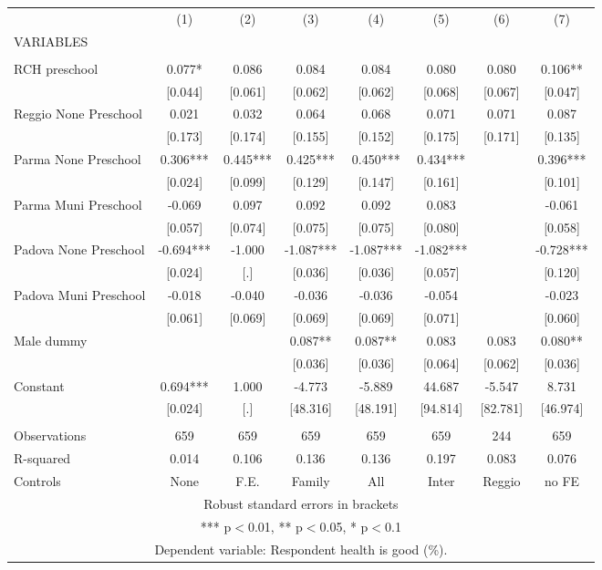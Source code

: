 \begin{tabular}{lccccccc} \hline
 & (1) & (2) & (3) & (4) & (5) & (6) & (7) \\
VARIABLES &  &  &  &  &  &  &  \\ \hline
 &  &  &  &  &  &  &  \\
RCH preschool & 0.077* & 0.086 & 0.084 & 0.084 & 0.080 & 0.080 & 0.106** \\
 & [0.044] & [0.061] & [0.062] & [0.062] & [0.068] & [0.067] & [0.047] \\
Reggio None Preschool & 0.021 & 0.032 & 0.064 & 0.068 & 0.071 & 0.071 & 0.087 \\
 & [0.173] & [0.174] & [0.155] & [0.152] & [0.175] & [0.171] & [0.135] \\
Parma None Preschool & 0.306*** & 0.445*** & 0.425*** & 0.450*** & 0.434*** &  & 0.396*** \\
 & [0.024] & [0.099] & [0.129] & [0.147] & [0.161] &  & [0.101] \\
Parma Muni Preschool & -0.069 & 0.097 & 0.092 & 0.092 & 0.083 &  & -0.061 \\
 & [0.057] & [0.074] & [0.075] & [0.075] & [0.080] &  & [0.058] \\
Padova None Preschool & -0.694*** & -1.000 & -1.087*** & -1.087*** & -1.082*** &  & -0.728*** \\
 & [0.024] & [.] & [0.036] & [0.036] & [0.057] &  & [0.120] \\
Padova Muni Preschool & -0.018 & -0.040 & -0.036 & -0.036 & -0.054 &  & -0.023 \\
 & [0.061] & [0.069] & [0.069] & [0.069] & [0.071] &  & [0.060] \\
Male dummy &  &  & 0.087** & 0.087** & 0.083 & 0.083 & 0.080** \\
 &  &  & [0.036] & [0.036] & [0.064] & [0.062] & [0.036] \\
Constant & 0.694*** & 1.000 & -4.773 & -5.889 & 44.687 & -5.547 & 8.731 \\
 & [0.024] & [.] & [48.316] & [48.191] & [94.814] & [82.781] & [46.974] \\
 &  &  &  &  &  &  &  \\
Observations & 659 & 659 & 659 & 659 & 659 & 244 & 659 \\
R-squared & 0.014 & 0.106 & 0.136 & 0.136 & 0.197 & 0.083 & 0.076 \\
 Controls & None & F.E. & Family & All & Inter & Reggio & no FE \\ \hline
\multicolumn{8}{c}{ Robust standard errors in brackets} \\
\multicolumn{8}{c}{ *** p$<$0.01, ** p$<$0.05, * p$<$0.1} \\
\multicolumn{8}{c}{ Dependent variable: Respondent health is good (\%).} \\
\end{tabular}
